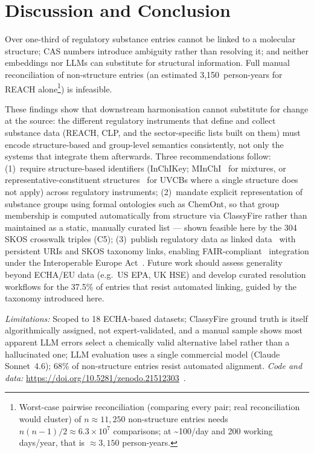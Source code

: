 \section{Discussion and Conclusion}

Over one-third of regulatory substance entries cannot be linked to a molecular structure; CAS numbers introduce ambiguity rather than resolving it; and neither embeddings nor LLMs can substitute for structural information. Full manual reconciliation of non-structure entries (an estimated 3,150~person-years for REACH alone\footnote{Worst-case pairwise reconciliation (comparing every pair; real reconciliation would cluster) of $n \approx 11{,}250$ non-structure entries needs $n(n-1)/2 \approx 6.3\times10^{7}$ comparisons; at \textasciitilde{}100/day and 200 working days/year, that is $\approx 3{,}150$ person-years.}) is infeasible.

These findings show that downstream harmonisation cannot substitute for change at the source: the different regulatory instruments that define and collect substance data (REACH, CLP, and the sector-specific lists built on them) must encode structure-based and group-level semantics consistently, not only the systems that integrate them afterwards.
Three recommendations follow: (1)~require structure-based identifiers (InChIKey; MInChI~\cite{Heller2015} for mixtures, or representative-constituent structures~\cite{Kutsarova2019} for UVCBs where a single structure does not apply) across regulatory instruments; (2)~mandate explicit representation of substance groups using formal ontologies such as ChemOnt, so that group membership is computed automatically from structure via ClassyFire rather than maintained as a static, manually curated list --- shown feasible here by the 304 SKOS crosswalk triples (C5); (3)~publish regulatory data as linked data~\cite{BernersLee2006LinkedData} with persistent URIs and SKOS taxonomy links, enabling FAIR-compliant~\cite{Wilkinson2016} integration under the Interoperable Europe Act~\cite{InteroperableEuropeAct2024}.
Future work should assess generality beyond ECHA/EU data (e.g.\ US EPA, UK HSE) and develop curated resolution workflows for the 37.5\% of entries that resist automated linking, guided by the taxonomy introduced here.

\textit{Limitations:} Scoped to 18 ECHA-based datasets; ClassyFire ground truth is itself algorithmically assigned, not expert-validated, and a manual sample shows most apparent LLM errors select a chemically valid alternative label rather than a hallucinated one; LLM evaluation uses a single commercial model (Claude Sonnet~4.6); 68\% of non-structure entries resist automated alignment.
\textit{Code and data:} \url{https://doi.org/10.5281/zenodo.21512303}~\cite{VanHaute2026Zenodo}.

